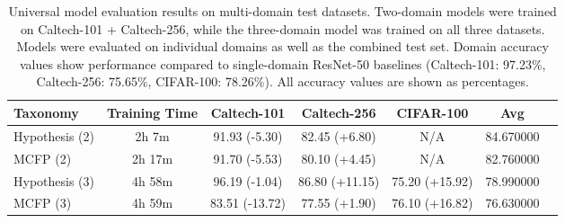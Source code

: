 \begin{table}[ht]
\centering
\caption{Universal model evaluation results on multi-domain test datasets. Two-domain models were trained on Caltech-101 + Caltech-256, while the three-domain model was trained on all three datasets. Models were evaluated on individual domains as well as the combined test set. Domain accuracy values show performance compared to single-domain ResNet-50 baselines (Caltech-101: 97.23\%, Caltech-256: 75.65\%, CIFAR-100: 78.26\%). All accuracy values are shown as percentages.}
\label{tab:universal_model_results}
\begin{tabular}{lcccccc}
\toprule
Taxonomy & Training Time & Caltech-101 & Caltech-256 & CIFAR-100 & Avg \\
\midrule
Hypothesis (2) & 2h 7m & 91.93 (-5.30) & 82.45 (+6.80) & N/A & 84.670000 \\
MCFP (2) & 2h 17m & 91.70 (-5.53) & 80.10 (+4.45) & N/A & 82.760000 \\
Hypothesis (3) & 4h 58m & 96.19 (-1.04) & 86.80 (+11.15) & 75.20 (+15.92) & 78.990000 \\
MCFP (3) & 4h 59m & 83.51 (-13.72) & 77.55 (+1.90) & 76.10 (+16.82) & 76.630000 \\
\bottomrule
\end{tabular}
\end{table}
